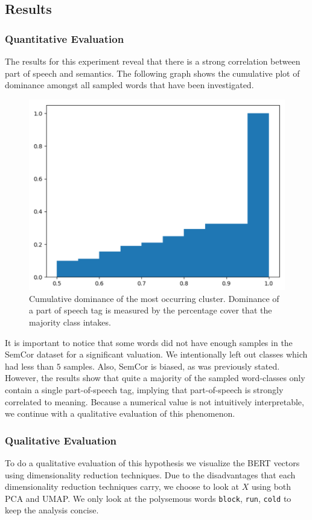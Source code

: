 \documentclass[a4paper,12pt,twoside,openright]{report}
\begin{document}
\subsection{Results}

\subsubsection{Quantitative Evaluation}

The results for this experiment reveal that there is a strong correlation between part of speech and semantics.
The following graph shows the cumulative plot of dominance amongst all sampled words that have been investigated.

\begin{figure}[H]
	\center
  \includegraphics[width=0.5\linewidth]{./assets/experiments/pos_dominance_calculation.png}
  \caption{Cumulative dominance of the most occurring cluster. Dominance of a part of speech tag is measured by the percentage cover that the majority class intakes.}
  \label{fig:POS_dominance}
\end{figure}

It is important to notice that some words did not have enough samples in the SemCor dataset for a significant valuation. 
We intentionally left out classes which had less than $5$ samples.
Also, SemCor is biased, as was previously stated.
However, the results show that quite a majority of the sampled word-classes only contain a single part-of-speech tag, implying that part-of-speech is strongly correlated to meaning.
Because a numerical value is not intuitively interpretable, we continue with a qualitative evaluation of this phenomenon.

\subsubsection{Qualitative Evaluation}


To do a qualitative evaluation of this hypothesis we visualize the BERT vectors using dimensionality reduction techniques.
Due to the disadvantages that each dimensionality reduction techniques carry, we choose to look at $X$ using both PCA and UMAP.
We only look at the polysemous words \Verb#block#, \Verb#run#, \Verb#cold# to keep the analysis concise.
\end{document}
